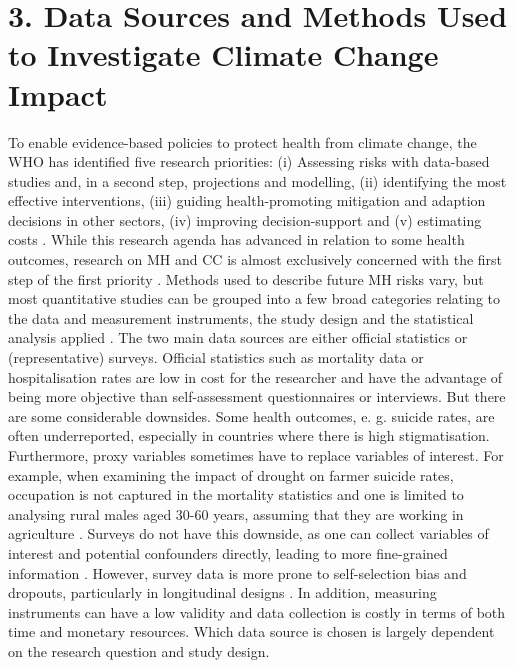 \documentclass[
]{krantz}
\begin{document}
\section{3. Data Sources and Methods Used to Investigate Climate Change Impact}\label{data-sources-and-methods-used-to-investigate-climate-change-impact}

To enable evidence-based policies to protect health from climate change, the WHO has identified five research priorities: (i) Assessing risks with data-based studies and, in a second step, projections and modelling, (ii) identifying the most effective interventions, (iii) guiding health-promoting mitigation and adaption decisions in other sectors, (iv) improving decision-support and (v) estimating costs \citep{worldhealthorganizationProtectingHealthClimate2009}.
While this research agenda has advanced in relation to some health outcomes, research on MH and CC is almost exclusively concerned with the first step of the first priority \citep{cianconiImpactClimateChange2020}. Methods used to describe future MH risks vary, but most quantitative studies can be grouped into a few broad categories relating to the data and measurement instruments, the study design and the statistical analysis applied \citep{charlsonClimateChangeMental2021}. The two main data sources are either official statistics or (representative) surveys. Official statistics such as mortality data or hospitalisation rates are low in cost for the researcher and have the advantage of being more objective than self-assessment questionnaires or interviews. But there are some considerable downsides. Some health outcomes, e. g. suicide rates, are often underreported, especially in countries where there is high stigmatisation. Furthermore, proxy variables sometimes have to replace variables of interest. For example, when examining the impact of drought on farmer suicide rates, occupation is not captured in the mortality statistics and one is limited to analysing rural males aged 30-60 years, assuming that they are working in agriculture \citep{carletonCropdamagingTemperaturesIncrease2017}. Surveys do not have this downside, as one can collect variables of interest and potential confounders directly, leading to more fine-grained information \citep{edwardsImpactDroughtMental2015}. However, survey data is more prone to self-selection bias and dropouts, particularly in longitudinal designs \citep{kesslerTrendsMentalIllness2008}. In addition, measuring instruments can have a low validity and data collection is costly in terms of both time and monetary resources. Which data source is chosen is largely dependent on the research question and study design.
\end{document}
